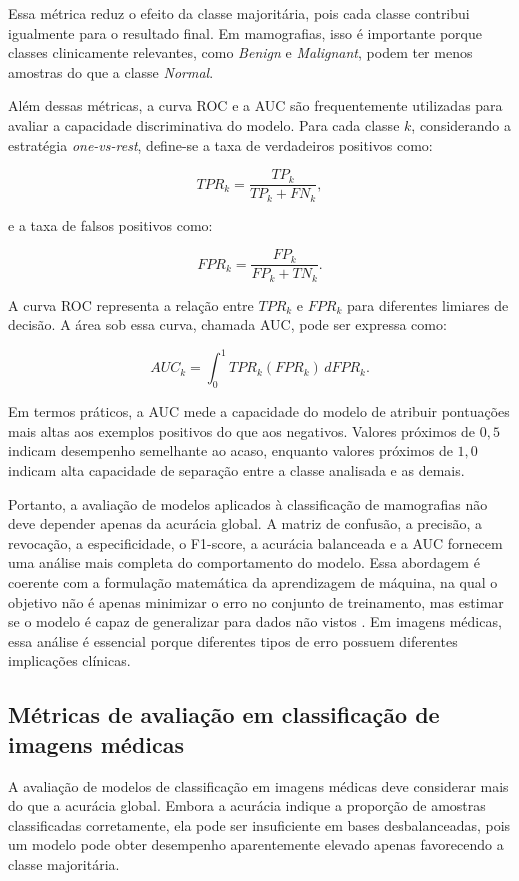 \documentclass[
    12pt,
    openright,
    oneside,
    a4paper,
    english,
    brazil
]{abntex2}
\begin{document}
Essa métrica reduz o efeito da classe majoritária, pois cada classe contribui igualmente para o resultado final. Em mamografias, isso é importante porque classes clinicamente relevantes, como \textit{Benign} e \textit{Malignant}, podem ter menos amostras do que a classe \textit{Normal}.

Além dessas métricas, a curva ROC e a AUC são frequentemente utilizadas para avaliar a capacidade discriminativa do modelo. Para cada classe \(k\), considerando a estratégia \textit{one-vs-rest}, define-se a taxa de verdadeiros positivos como:

\[
TPR_k =
\frac{TP_k}{TP_k + FN_k},
\]

e a taxa de falsos positivos como:

\[
FPR_k =
\frac{FP_k}{FP_k + TN_k}.
\]

A curva ROC representa a relação entre \(TPR_k\) e \(FPR_k\) para diferentes limiares de decisão. A área sob essa curva, chamada AUC, pode ser expressa como:

\[
AUC_k =
\int_{0}^{1}
TPR_k(FPR_k)\,dFPR_k.
\]

Em termos práticos, a AUC mede a capacidade do modelo de atribuir pontuações mais altas aos exemplos positivos do que aos negativos. Valores próximos de \(0{,}5\) indicam desempenho semelhante ao acaso, enquanto valores próximos de \(1{,}0\) indicam alta capacidade de separação entre a classe analisada e as demais.

Portanto, a avaliação de modelos aplicados à classificação de mamografias não deve depender apenas da acurácia global. A matriz de confusão, a precisão, a revocação, a especificidade, o F1-score, a acurácia balanceada e a AUC fornecem uma análise mais completa do comportamento do modelo. Essa abordagem é coerente com a formulação matemática da aprendizagem de máquina, na qual o objetivo não é apenas minimizar o erro no conjunto de treinamento, mas estimar se o modelo é capaz de generalizar para dados não vistos \cite{deisenroth2020mathematics}. Em imagens médicas, essa análise é essencial porque diferentes tipos de erro possuem diferentes implicações clínicas.


\subsection{Métricas de avaliação em classificação de imagens médicas}

A avaliação de modelos de classificação em imagens médicas deve considerar mais do que a acurácia global. Embora a acurácia indique a proporção de amostras classificadas corretamente, ela pode ser insuficiente em bases desbalanceadas, pois um modelo pode obter desempenho aparentemente elevado apenas favorecendo a classe majoritária.
\end{document}
